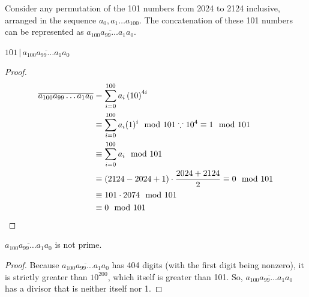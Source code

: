 \documentclass[10pt]{../usamts}
\begin{document}
\begin{solution}{2}

Consider any permutation of the 101 numbers from 2024 to 2124 inclusive, arranged in the sequence $a_0, a_1 \dots a_{100}$. The concatenation of these 101 numbers can be represented as $\overline{a_{100} a_{99} \dots a_{1} a_{0}}$.

\begin{claim}
    $101\,|\,\overline{a_{100} a_{99} \dots a_{1} a_{0}}$
\end{claim}
\begin{proof}
    
    \begin{align*}
    \overline{a_{100} a_{99} \dots a_{1} a_{0}}
        &= \sum_{i=0}^{100} a_i \left( 10 \right)^{4i} \\
        &\equiv \sum_{i=0}^{100} a_i (1)^i \mod 101 \because 10^4 \equiv 1 \mod 101\\
        &\equiv \sum_{i=0}^{100} a_i \mod 101 \\
        &\equiv (2124 - 2024 + 1) \cdot \frac{2024 + 2124}{2} \equiv 0 \mod 101 \\
        &\equiv 101 \cdot 2074 \mod 101 \\
        &\equiv 0 \mod 101
    \end{align*}
\end{proof}
\begin{claim}
    $\overline{a_{100} a_{99} \dots a_{1} a_{0}}$ is not prime.
\end{claim}
\begin{proof}
    Because
    $\overline{a_{100} a_{99} \dots a_{1} a_{0}}$ has 404 digits (with the first digit being nonzero), it is strictly greater than $10^{200}$, which itself is greater than 101. So, $\overline{a_{100} a_{99} \dots a_{1} a_{0}}$ has a divisor that is neither itself nor 1.
\end{proof}

\end{solution}
\end{document}
